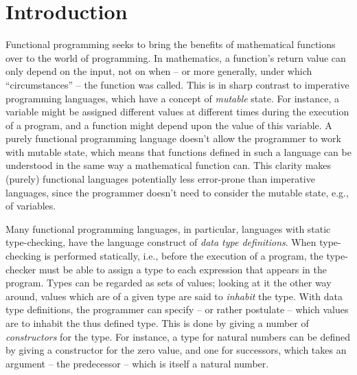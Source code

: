 \chapter{Introduction}

Functional programming seeks to bring the benefits of mathematical functions over to the world of programming. In mathematics, a function's return value can only depend on the input, not on when -- or more generally, under which ``circumstances'' -- the function was called. This is in sharp contrast to imperative programming languages, which have a concept of \textit{mutable} state. For instance, a variable might be assigned different values at different times during the execution of a program, and a function might depend upon the value of this variable. A purely functional programming language doesn't allow the programmer to work with mutable state, which means that functions defined in such a language can be understood in the same way a mathematical function can. This clarity makes (purely) functional languages potentially less error-prone than imperative languages, since the programmer doesn't need to consider the mutable state, e.g., of variables.

Many functional programming languages, in particular, languages with static type-checking, have the language construct of \textit{data type definitions}. When type-checking is performed statically, i.e., before the execution of a program, the type-checker must be able to assign a type to each expression that appears in the program. Types can be regarded as sets of values; looking at it the other way around, values which are of a given type are said to \textit{inhabit} the type. With data type definitions, the programmer can specify -- or rather postulate -- which values are to inhabit the thus defined type. This is done by giving a number of \textit{constructors} for the type. For instance, a type for natural numbers can be defined by giving a constructor for the zero value, and one for successors, which takes an argument -- the predecessor -- which is itself a natural number.

